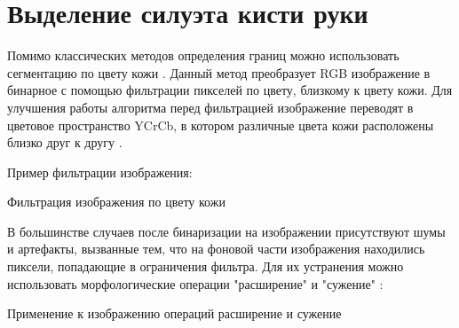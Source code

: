 \section{Выделение силуэта кисти руки}
\label{sec:Threholding}

Помимо классических методов определения границ можно использовать сегментацию по цвету кожи \cite{Phung}. Данный метод преобразует RGB изображение в бинарное с помощью фильтрации пикселей по цвету, близкому к цвету кожи. Для улучшения работы алгоритма перед фильтрацией изображение переводят в цветовое пространство YCrCb, в котором различные цвета кожи  расположены близко друг к другу \cite{Siddharth}.

Пример фильтрации изображения: 

\begin{minipage}{0.75\textwidth}
	\begin{algorithm}[H]
		
		\caption{Фильтрация изображения по цвету кожи}
		\label{imp:color-filter}
	\end{algorithm}
\end{minipage}

В большинстве случаев после бинаризации на изображении присутствуют шумы и артефакты, вызванные тем, что на фоновой части изображения находились пиксели, попадающие в ограничения фильтра. Для их устранения можно использовать морфологические операции "расширение" и "сужение" \cite{DIP}:

\begin{minipage}{0.75\textwidth}
	\begin{algorithm}[H]
		
		\caption{Применение к изображению операций расширение и сужение}
		\label{imp:color-noise}
	\end{algorithm}
\end{minipage}